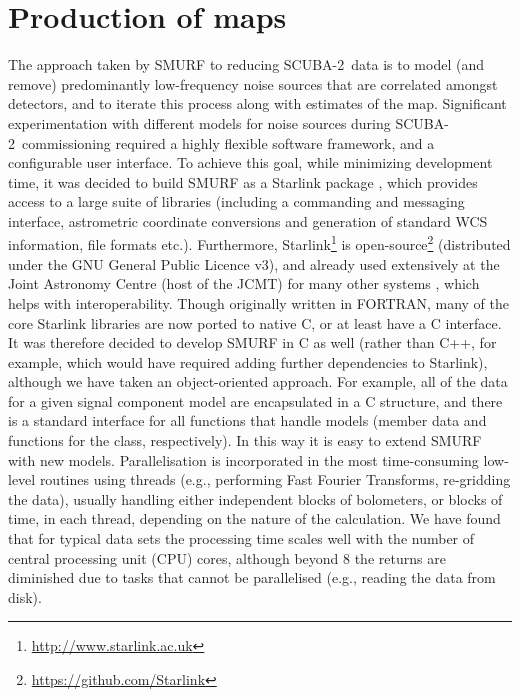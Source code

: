\documentclass[useAMS,usenatbib,nofootinbib]{mn2e}
\newcommand{\scuba}{SCUBA-2}
\begin{document}
\section{Production of maps}
\label{sec:algorithm}

The approach taken by SMURF to reducing \scuba\ data is to model (and
remove) predominantly low-frequency noise sources that are correlated
amongst detectors, and to iterate this process along with estimates of
the map. Significant experimentation with different models for noise
sources during \scuba\ commissioning required a highly flexible
software framework, and a configurable user interface. To achieve this
goal, while minimizing development time, it was decided to build SMURF
as a Starlink package \citep{2009ASPC..411..418J}, which provides
access to a large suite of libraries (including a commanding and
messaging interface, astrometric coordinate conversions and generation
of standard WCS information, file formats etc.). Furthermore,
Starlink\footnote{\url{http://www.starlink.ac.uk}} is
open-source\footnote{\url{https://github.com/Starlink}} (distributed
under the GNU General Public Licence v3), and already used extensively
at the Joint Astronomy Centre (host of the JCMT) for many other
systems \citep{jenness2011}, which helps with interoperability. Though
originally written in FORTRAN, many of the core Starlink libraries are
now ported to native C, or at least have a C interface. It was
therefore decided to develop SMURF in C as well (rather than C++, for
example, which would have required adding further dependencies to
Starlink), although we have taken an object-oriented approach. For
example, all of the data for a given signal component model are
encapsulated in a C structure, and there is a standard interface for
all functions that handle models (member data and functions for the
class, respectively). In this way it is easy to extend SMURF with new
models. Parallelisation is incorporated in the most time-consuming
low-level routines using threads (e.g., performing Fast Fourier
Transforms, re-gridding the data), usually handling either independent
blocks of bolometers, or blocks of time, in each thread, depending on
the nature of the calculation. We have found that for typical data
sets the processing time scales well with the number of central
processing unit (CPU) cores, although beyond 8 the returns are
diminished due to tasks that cannot be parallelised (e.g., reading the
data from disk).
\end{document}
